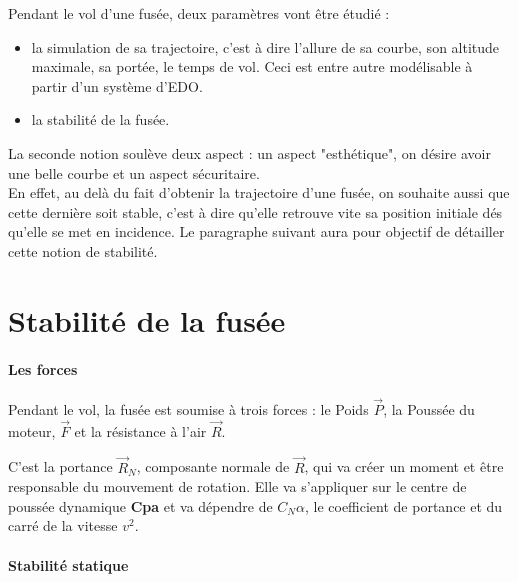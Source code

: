 \documentclass[a4paper]{article}
\begin{document}
Pendant le vol d'une fusée, deux paramètres vont être étudié : 

\begin{itemize}

\item la simulation de sa trajectoire, c'est à dire l'allure de sa courbe, son altitude maximale, sa portée, le temps de vol. Ceci est entre autre modélisable à partir d'un système d'EDO.
\item la stabilité de la fusée.


\end{itemize}

La seconde notion soulève deux aspect : un aspect "esthétique", on désire avoir une belle courbe et un aspect sécuritaire.\\

En effet, au delà du fait d'obtenir la trajectoire d'une fusée, on souhaite aussi que cette dernière soit stable, c'est à dire qu'elle retrouve vite sa position initiale dés qu'elle se met en incidence.
Le paragraphe suivant aura pour objectif de détailler cette notion de stabilité.




\section{Stabilité de la fusée}



\paragraph{Les forces}
Pendant le vol, la fusée est soumise à trois forces : le Poids \textbf{$\vec P$}, la Poussée du moteur, \textbf{$\vec F$} et la résistance à l'air \textbf{$\vec R$}.

C'est la portance \textbf{$\vec R_{N}$}, composante normale de \textbf{$\vec R$}, qui va créer un moment et être responsable du mouvement de rotation. Elle va s'appliquer sur le centre de poussée dynamique \textbf{Cpa} et va dépendre de \textbf{$C_{N}\alpha$}, le coefficient de portance et du carré de la vitesse \textbf{$v^{2}$}. \\
\paragraph{Stabilité statique}
\end{document}
